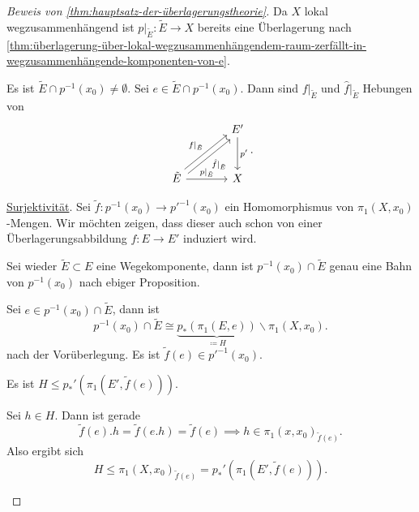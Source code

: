 \begin{proof}[Beweis von \autoref{thm:hauptsatz-der-überlagerungstheorie}]
    Da $X$ lokal wegzusammenhängend ist  $p|_{\tilde{E}}\colon \tilde{E} \to  X$ bereits eine Überlagerung nach \autoref{thm:überlagerung-über-lokal-wegzusammenhängendem-raum-zerfällt-in-wegzusammenhängende-komponenten-von-e}.

    Es ist $\tilde{E} \cap  p^{-1} (x_0) \neq  \emptyset$. Sei $e\in \tilde{E} \cap  p^{-1} (x_0)$. Dann sind $f|_{\tilde{E}}$ und $\hat{f}|_{\tilde{E}}$ Hebungen von
    \[
        \begin{tikzcd}[column sep = large, row sep = large]
        & E' \ar{d}{p'} \\
        \tilde{E} \ar[shift left]{ur}{f|_{\tilde{E}}} \ar[shift right, swap]{ur}{\hat{f}|_{\tilde{E}}} \ar{r}{p|_{\tilde{E}}} & X
    \end{tikzcd}
    .\] 

    \underline{Surjektivität}. Sei $\tilde{f} \colon  p^{-1} (x_0) \to  p'^{-1}(x_0)$ ein Homomorphismus von $\pi_1(X,x_0)$-Mengen. Wir möchten zeigen, dass dieser auch schon von einer Überlagerungsabbildung $f\colon  E \to  E'$ induziert wird. 

    Sei wieder $\tilde{E} \subset E$ eine Wegekomponente, dann ist $p^{-1} (x_0) \cap \tilde{E}$ genau eine Bahn von $p^{-1} (x_0)$ nach ebiger Proposition.

    Sei $e\in p^{-1} (x_0) \cap \tilde{E}$, dann ist
    \[
        p^{-1} (x_0) \cap  \tilde{E} \cong \underbrace{p_*(\pi_1(E,e))}_{\coloneqq H} \backslash \pi_1(X,x_0)
    .\] 
    nach der Vorüberlegung. Es ist $\tilde{f}(e) \in p'^{-1}(x_0)$.

    \begin{claim}
        Es ist $H\leq  p_*'(\pi_1(E',\tilde{f}(e)))$.
    \end{claim}
    \begin{subproof}
        Sei $h\in H$. Dann ist gerade
        \[
            \tilde{f}(e).  h = \tilde{f}(e.h) = \tilde{f}(e) \implies h\in \pi_1(x,x_0)_{\tilde{f}(e)}
        .\] 
        Also ergibt sich
        \[
            H \leq  \pi_1(X,x_0)_{\tilde{f}(e)} = p_*'(\pi_1(E',\tilde{f}(e)))
        .\] 
    \end{subproof}


\end{proof}
